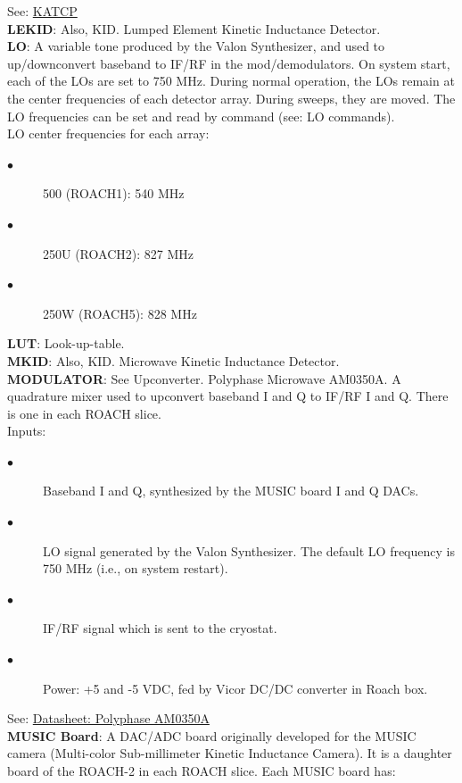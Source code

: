 See: \href{https://casper.ssl.berkeley.edu/wiki/KATCP}{KATCP}\\
\textbf{LEKID}: Also, KID. Lumped Element Kinetic Inductance Detector.\\
\textbf{LO}: A variable tone produced by the Valon Synthesizer, and used to up/downconvert baseband to IF/RF in the mod/demodulators. On system start, each of the LOs are set to 750 MHz. During normal operation, the LOs remain at the center frequencies of each detector array. During sweeps, they are moved. The LO frequencies can be set and read by command (see: LO commands).\\
LO center frequencies for each array:
\begin{description}
  \item[$\bullet$] 500 (ROACH1): 540 MHz
  \item[$\bullet$] 250U (ROACH2): 827 MHz
  \item[$\bullet$] 250W (ROACH5): 828 MHz
\end{description}
\textbf{LUT}: Look-up-table.\\
\textbf{MKID}: Also, KID. Microwave Kinetic Inductance Detector.\\
\textbf{MODULATOR}: See Upconverter. Polyphase Microwave AM0350A. A quadrature mixer used to upconvert baseband I and Q to IF/RF I and Q. There is one in each ROACH slice.\\
Inputs:
\begin{description}
  \item[$\bullet$] Baseband I and Q, synthesized by the MUSIC board I and Q DACs.
  \item[$\bullet$] LO signal generated by the Valon Synthesizer. The default LO frequency is 750 MHz (i.e., on system restart).
  \item[$\bullet$ ]IF/RF signal which is sent to the cryostat.
  \item[$\bullet$] Power: +5 and -5 VDC, fed by Vicor DC/DC converter in Roach box.
\end{description}
See: \href{https://polyphasemicrowave.com/media/AM0350A_RevA.pdf}{Datasheet: Polyphase AM0350A}\\
\textbf{MUSIC Board}: A DAC/ADC board originally developed for the MUSIC camera (Multi-color Sub-millimeter Kinetic Inductance Camera). It is a daughter board of the ROACH-2 in each ROACH slice. Each MUSIC board has:
